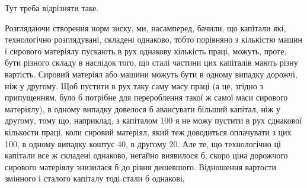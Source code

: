 Тут треба відрізняти таке.

Розглядаючи створення норм зиску, ми, насамперед, бачили, що капітали
які, технологічно розглядувані, складені однаково, тобто порівняно з кількістю
машин і сирового матеріялу пускають в рух однакову кількість праці,
можуть, проте, бути різного складу в наслідок того, що сталі частини цих капіталів
мають різну вартість. Сировий матеріял або машини можуть бути в
одному випадку дорожчі, ніж у другому. Щоб пустити в рух таку саму масу
праці (а це, згідно з припущенням, було б потрібне для перероблення такої ж
самої маси сирового матеріялу), в одному випадку довелося б авансувати більший
капітал, ніж у другому, тому що, наприклад, з капіталом 100 я не можу пустити
в рух сднакової кількости праці, коли сировий матеріял, який теж доводиться
оплачувати з цих 100, в одному випадку коштує 40, в другому 20.
Але те, що технологічно ці капітали все ж складені однаково, негайно виявилося
б, скоро ціна дорожчого сирового матеріялу знизилася б до рівня дешевшого.
Відношення вартости змінного і сталого капіталу тоді стали б однакові,
\parbreak{}  %
